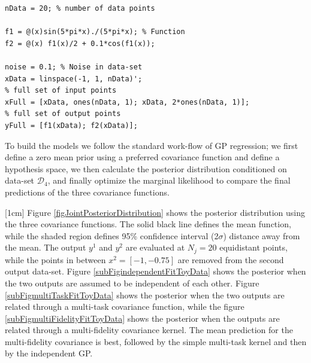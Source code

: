 \begin{mdframed}[hidealllines=true,backgroundcolor=lightgray!20]
\begin{lstlisting}[caption={Code for data-set D4}, 
                    captionpos=b,
                    label={codeDatasetD4},
                    style=Matlab-editor, 
                    basicstyle=\color{black}\ttfamily\small,
                    backgroundcolor = \color{MatlabCellColour}]
nData = 20; % number of data points

f1 = @(x)sin(5*pi*x)./(5*pi*x); % Function
f2 = @(x) f1(x)/2 + 0.1*cos(f1(x));

noise = 0.1; % Noise in data-set
xData = linspace(-1, 1, nData)';
% full set of input points
xFull = [xData, ones(nData, 1); xData, 2*ones(nData, 1)]; 
% full set of output points
yFull = [f1(xData); f2(xData)];
\end{lstlisting}
\end{mdframed}

\begin{mdframed}[hidealllines=true,backgroundcolor=lightgray!20]
To build the models we follow the standard work-flow of GP regression; we first define a zero mean prior using a preferred covariance function and define a hypothesis space, we then calculate the posterior distribution conditioned on data-set $\mathcal{D}_{4}$, and finally optimize the marginal likelihood to compare the final predictions of the three covariance functions. 

[1cm]
Figure \ref{figJointPosteriorDistribution} shows the posterior distribution using the three covariance functions. The solid black line defines the mean function, while the shaded region defines 95\% confidence interval (2$\sigma$) distance away from the mean. The output $y^{1}$ and $y^2$ are evaluated at $N_{j}=20$ equidistant points, while the points in between $x^2 = [-1, -0.75]$ are removed from the second output data-set. Figure \ref{subFigindependentFitToyData} shows the posterior when the two outputs are assumed to be independent of each other. Figure \ref{subFigmultiTaskFitToyData} shows the posterior when the two outputs are related through a multi-task covariance function, while the figure \ref{subFigmultiFidelityFitToyData} shows the posterior when the outputs are related through a multi-fidelity covariance kernel. The mean prediction for the multi-fidelity covariance is best, followed by the simple multi-task kernel and then by the independent GP.
\end{mdframed}


